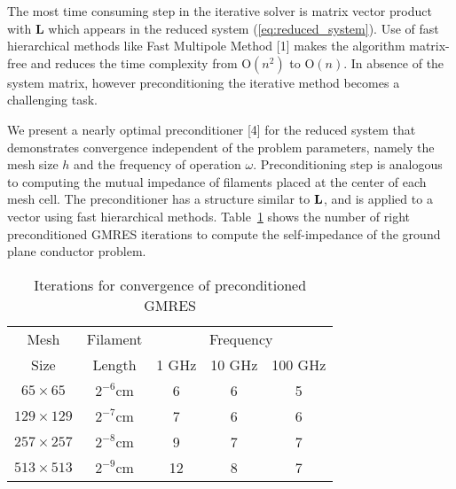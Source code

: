 \documentclass{report}
\begin{document}
The most time consuming step in the iterative solver is matrix vector
product with {\bf L} which appears in the reduced system
(\ref{eq:reduced_system}). Use of fast hierarchical methods like Fast
Multipole Method [1] makes the algorithm matrix-free and reduces the time
complexity from O$(n^2)$ to O$(n)$. In absence of the system matrix,
however preconditioning the iterative method becomes a challenging task.

We present a nearly optimal preconditioner [4] for the reduced system
that demonstrates convergence independent of the problem parameters,
namely the mesh size $h$ and the frequency of operation $\omega$.
Preconditioning step is analogous to computing the mutual impedance of
filaments placed at the center of each mesh cell. The preconditioner has
a structure similar to ${\bf L}$, and is applied to a vector using fast
hierarchical methods. Table~\ref{tab:iter} shows the number of right
preconditioned GMRES iterations to compute the self-impedance of the
ground plane conductor problem.
\begin{table}[h]
\centering
\begin{tabular}{|c|c|c|c|c|} \hline
{Mesh} & {Filament} & \multicolumn {3}{|c|}{Frequency}\\
\cline{3-5}
{Size} & {Length} & 1 GHz & 10 GHz & 100 GHz \\ \hline
$65 \times 65$ & $2^{-6}$cm & 6 & 6 & 5 \\ \hline
$129 \times 129$ & $2^{-7}$cm & 7 & 6 & 6 \\ \hline
$257 \times 257$ & $2^{-8}$cm & 9 & 7 & 7 \\ \hline
$513 \times 513$ & $2^{-9}$cm & 12 & 8 & 7 \\ \hline
\end{tabular}
\caption{Iterations for convergence of preconditioned GMRES}
\label{tab:iter}
\end{table}
\end{document}
